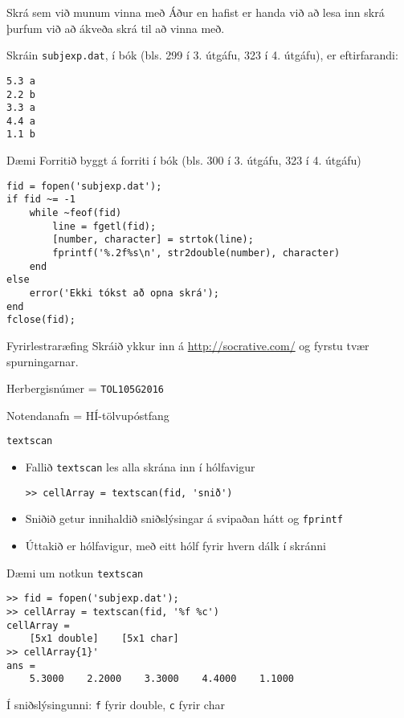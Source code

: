 \documentclass{beamer}
\begin{document}
\begin{frame}[fragile]{Skrá sem við munum vinna með}
Áður en hafist er handa við að lesa inn skrá þurfum við að ákveða skrá til að vinna með.

Skráin \texttt{subjexp.dat}, í bók (bls. 299 í 3. útgáfu, 323 í 4. útgáfu), er eftirfarandi:
\begin{verbatim}
5.3	a
2.2	b
3.3	a
4.4	a
1.1	b
\end{verbatim}

\end{frame}


\begin{frame}[fragile]{Dæmi}
Forritið byggt á forriti í bók (bls. 300 í 3. útgáfu, 323 í 4. útgáfu)
\begin{verbatim}
fid = fopen('subjexp.dat');
if fid ~= -1
    while ~feof(fid)
        line = fgetl(fid);
        [number, character] = strtok(line);
        fprintf('%.2f%s\n', str2double(number), character)
    end
else
    error('Ekki tókst að opna skrá');
end
fclose(fid);
\end{verbatim}
\end{frame}

\begin{frame}{Fyrirlestraræfing}
Skráið ykkur inn á \url{http://socrative.com/} og fyrstu tvær spurningarnar.

Herbergisnúmer = \texttt{TOL105G2016}

Notendanafn = HÍ-tölvupóstfang
\end{frame}

\begin{frame}[fragile]{\texttt{textscan}}
\begin{itemize}
 \item Fallið \texttt{textscan} les alla skrána inn í hólfavigur
\begin{verbatim}
>> cellArray = textscan(fid, 'snið')
\end{verbatim}
 \item Sniðið getur innihaldið sniðslýsingar á svipaðan hátt og \texttt{fprintf}
 \item Úttakið er hólfavigur, með eitt hólf fyrir hvern dálk í skránni
\end{itemize}
\end{frame}

\begin{frame}[fragile]{Dæmi um notkun \texttt{textscan}}
\begin{verbatim}
>> fid = fopen('subjexp.dat');
>> cellArray = textscan(fid, '%f %c')
cellArray = 
    [5x1 double]    [5x1 char]
>> cellArray{1}'
ans =
    5.3000    2.2000    3.3000    4.4000    1.1000
\end{verbatim}
Í sniðslýsingunni: \texttt{f} fyrir double, \texttt{c} fyrir char
\end{frame}
\end{document}
